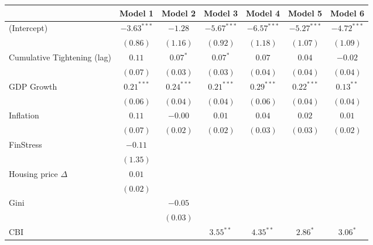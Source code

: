 
\begin{tabular}{l c c c c c c }
\hline
 & Model 1 & Model 2 & Model 3 & Model 4 & Model 5 & Model 6 \\
\hline
(Intercept)                 & $-3.63^{***}$ & $-1.28$      & $-5.67^{***}$ & $-6.57^{***}$ & $-5.27^{***}$ & $-4.72^{***}$ \\
                            & $(0.86)$      & $(1.16)$     & $(0.92)$      & $(1.18)$      & $(1.07)$      & $(1.09)$      \\
Cumulative Tightening (lag) & $0.11$        & $0.07^{*}$   & $0.07^{*}$    & $0.07$        & $0.04$        & $-0.02$       \\
                            & $(0.07)$      & $(0.03)$     & $(0.03)$      & $(0.04)$      & $(0.04)$      & $(0.04)$      \\
GDP Growth                  & $0.21^{***}$  & $0.24^{***}$ & $0.21^{***}$  & $0.29^{***}$  & $0.22^{***}$  & $0.13^{**}$   \\
                            & $(0.06)$      & $(0.04)$     & $(0.04)$      & $(0.06)$      & $(0.04)$      & $(0.04)$      \\
Inflation                   & $0.11$        & $-0.00$      & $0.01$        & $0.04$        & $0.02$        & $0.01$        \\
                            & $(0.07)$      & $(0.02)$     & $(0.02)$      & $(0.03)$      & $(0.03)$      & $(0.02)$      \\
FinStress                   & $-0.11$       &              &               &               &               &               \\
                            & $(1.35)$      &              &               &               &               &               \\
Housing price $\Delta$      & $0.01$        &              &               &               &               &               \\
                            & $(0.02)$      &              &               &               &               &               \\
Gini                        &               & $-0.05$      &               &               &               &               \\
                            &               & $(0.03)$     &               &               &               &               \\
CBI                         &               &              & $3.55^{**}$   & $4.35^{**}$   & $2.86^{*}$    & $3.06^{*}$    \\

\end{tabular}
